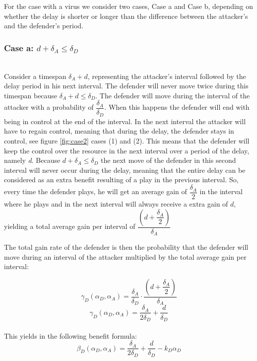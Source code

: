 \documentclass[master=cws, masteroption=vs]{kulemt}
\begin{document}
\begin{abstract*}
For the case with a virus we consider two cases, Case a and Case b, depending on whether the delay is shorter or longer than the difference between the attacker's and the defender's period.  \\


\subsubsection*{\textbf{Case a:} $d + \delta_{A} \leq \delta_{D}$}
~~\\
Consider a timespan $\delta_{A} + d$, representing the attacker's interval followed by the delay period in his next interval. The defender will never move twice during this timespan because $\delta_{A} + d \leq \delta_{D}$. The defender will move during the interval of the attacker with a probability of $\dfrac{\delta_{A}}{\delta_{D}} $. When this happens the defender will end with being in control at the end of the interval. In the next interval the attacker will have to regain control, meaning that during the delay, the defender stays in control, see figure \ref{fig:case2} cases (1) and (2). This means that the defender will keep the control over the resource in the next interval over a period of the delay, namely \textit{d}. Because $d + \delta_{A} \leq \delta_{D}$ the next move of the defender in this second interval will never occur during the delay, meaning that the entire delay can be considered as an extra benefit resulting of a play in the previous interval. 
So, every time the defender plays, he will get an average gain of $\dfrac{\delta_{A}}{2}$ in the interval where he plays and in the next interval will always receive a extra gain of $d$, yielding a total average gain per interval of
$\dfrac{(d+\dfrac{\delta_{A}}{2})}{\delta_{A}}$

The total gain  rate of the defender is then the probability that the defender will move during an interval of the attacker multiplied by the total average gain per interval: 

\begin{equation}\label{first}
\gamma_{D}(\alpha_{D},\alpha_{A}) = \dfrac{\delta_{A}}{\delta_{D}} \cdot \dfrac{(d+\dfrac{\delta_{A}}{2})}{\delta_{A}} 
\end{equation}
\begin{equation}\label{first}
\gamma_{D}(\alpha_{D},\alpha_{A}) = \dfrac{\delta_{A}}{2\delta_{D}} + \dfrac{d}{\delta_{D}} 
\end{equation}\\
This yields in the following benefit formula:
\begin{equation}\label{first}
\beta_{D}(\alpha_{D},\alpha_{A}) = \dfrac{\delta_{A}}{2\delta_{D}} + \dfrac{d}{\delta_{D}} - k_{D} \alpha_{D} 
\end{equation}\\


\end{abstract*}
\end{document}
